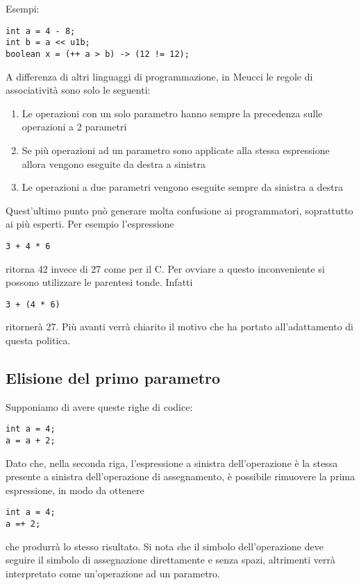 \documentclass[10pt]{book}%
\newcommand{\e}{\`{e} }
\newcommand{\ac}[1]{\`{#1}}
\newenvironment{codeenv}{
\begin{mdframed}[backgroundcolor=black!20,topline=false,leftline=false,rightline=false,bottomline=false]
}
{\end{mdframed}}
\begin{document}
Esempi:
\begin{codeenv}
\begin{verbatim}
int a = 4 - 8;
int b = a << u1b;
boolean x = (++ a > b) -> (12 != 12);
\end{verbatim}
\end{codeenv}
A differenza di altri linguaggi di programmazione, in Meucci le regole di associativit\ac a sono solo le seguenti:
\begin{enumerate}
\item Le operazioni con un solo parametro hanno sempre la precedenza sulle operazioni a 2 parametri
\item Se pi\ac u operazioni ad un parametro sono applicate alla stessa espressione allora vengono eseguite da destra a sinistra
\item Le operazioni a due parametri vengono eseguite sempre da sinistra a destra
\end{enumerate}
Quest'ultimo punto pu\ac o generare molta confusione ai programmatori, soprattutto ai pi\ac u esperti. Per esempio l'espressione
\begin{codeenv}
\begin{verbatim}
3 + 4 * 6
\end{verbatim}
\end{codeenv}
ritorna 42 invece di 27 come per il C. Per ovviare a questo inconveniente si possono utilizzare le parentesi tonde. Infatti
\begin{codeenv}
\begin{verbatim}
3 + (4 * 6)
\end{verbatim}
\end{codeenv}
ritorner\ac a 27. Pi\ac u avanti verr\ac a chiarito il motivo che ha portato all'adattamento di questa politica.

\subsection*{Elisione del primo parametro}
Supponiamo di avere queste righe di codice:
\begin{codeenv}
\begin{verbatim}
int a = 4;
a = a + 2;
\end{verbatim}
\end{codeenv}
Dato che, nella seconda riga, l'espressione a sinistra dell'operazione \e la stessa presente a sinistra dell'operazione di assegnamento, \e possibile rimuovere la prima espressione, in modo da ottenere
\begin{codeenv}
\begin{verbatim}
int a = 4;
a =+ 2;
\end{verbatim}
\end{codeenv}
che produrr\ac a lo stesso risultato. Si nota che il simbolo dell'operazione deve seguire il simbolo di assegnazione direttamente e senza spazi, altrimenti verr\ac a interpretato come un'operazione ad un parametro.
\end{document}

